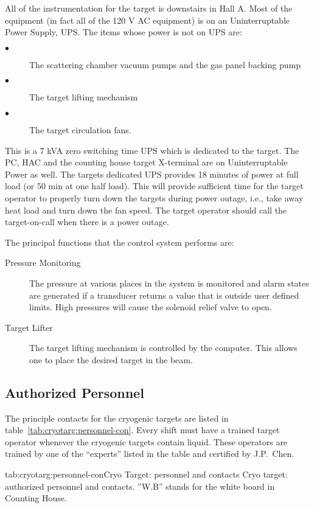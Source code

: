 {All of the instrumentation for the target is downstairs in Hall A.
Most of the equipment (in fact all of the 120 V AC equipment) is
on an Uninterruptable Power Supply, UPS. The items whose power
is not on UPS are:
\begin{description}
\item[$\bullet$] The scattering chamber vacuum pumps and the gas panel
backing pump
\item[$\bullet$] The target lifting mechanism
\item[$\bullet$] The target circulation fans.
\end{description}
This is a 7 kVA zero switching time
UPS which is dedicated to the target. The PC, HAC and the counting house target
X-terminal are on Uninterruptable Power as well. 
The targets dedicated UPS provides 18 minutes of power at full load
(or 50 min at one half load). This will provide sufficient time for
the target operator to properly turn down the targets during power outage, 
i.e., take away heat load and turn down the fan speed. The target
operator should call the target-on-call when there is a power outage. 

The principal functions that the control system performs are:
\begin{description}
\item[Pressure Monitoring] The pressure at various places in the system is
monitored and alarm states are generated if a transducer returns a value
that is outside user defined limits. High pressures will cause the
solenoid relief valve to open.
\item[Target Lifter] The target lifting mechanism is controlled by
the computer. This allows one to place the desired target in the beam.
\end{description}

\begin{safetyen}{10}{15}
\subsection{ Authorized Personnel}
\end{safetyen}

The principle contacts for the cryogenic targets are listed in 
table~\ref{tab:cryotarg:personnel-con}. Every shift must have a trained target
operator whenever the cryogenic targets contain liquid. These
operators are trained by one of the ``experts'' listed in the
table and certified by J.P.~Chen.

\begin{namestab}{tab:cryotarg:personnel-con}{Cryo Target: personnel and contacts}{%
   Cryo target: authorized personnel and contacts. ''W.B'' stands for the white board
   in Counting House.}
   \DaveMeekins{}
   \MikellSeely{}
   \ChristopherKeith{}
\end{namestab}

} %
